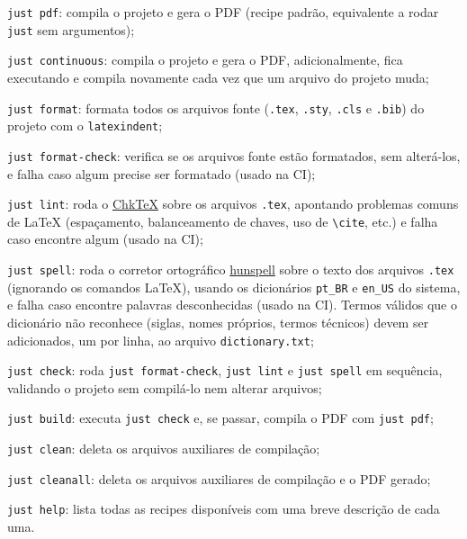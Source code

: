 \begin{alineas}
  \item \texttt{just pdf}: compila o projeto e gera o PDF (recipe padrão, equivalente a rodar \texttt{just} sem argumentos);

  \item \texttt{just continuous}: compila o projeto e gera o PDF, adicionalmente, fica executando e compila novamente cada vez que um arquivo do projeto muda;

  \item \texttt{just format}: formata todos os arquivos fonte (\texttt{.tex}, \texttt{.sty}, \texttt{.cls} e \texttt{.bib}) do projeto com o \texttt{latexindent};

  \item \texttt{just format-check}: verifica se os arquivos fonte estão formatados, sem alterá-los, e falha caso algum precise ser formatado (usado na CI);

  \item \texttt{just lint}: roda o  \href{https://www.nongnu.org/chktex/}{ChkTeX} sobre os arquivos \texttt{.tex}, apontando problemas comuns de \LaTeX{} (espaçamento, balanceamento de chaves, uso de \texttt{\textbackslash{}cite}, etc.) e falha caso encontre algum (usado na CI); %

  \item \texttt{just spell}: roda o corretor ortográfico \href{https://hunspell.github.io/}{hunspell} sobre o texto dos arquivos \texttt{.tex} (ignorando os comandos \LaTeX{}), usando os dicionários \texttt{pt\_BR} e \texttt{en\_US} do sistema, e falha caso encontre palavras desconhecidas (usado na CI). Termos válidos que o dicionário não reconhece (siglas, nomes próprios, termos técnicos) devem ser adicionados, um por linha, ao arquivo \texttt{dictionary.txt};

  \item \texttt{just check}: roda \texttt{just format-check}, \texttt{just lint} e \texttt{just spell} em sequência, validando o projeto sem compilá-lo nem alterar arquivos;

  \item \texttt{just build}: executa \texttt{just check} e, se passar, compila o PDF com \texttt{just pdf};

  \item \texttt{just clean}: deleta os arquivos auxiliares de compilação;

  \item \texttt{just cleanall}: deleta os arquivos auxiliares de compilação e o PDF gerado;

  \item \texttt{just help}: lista todas as recipes disponíveis com uma breve descrição de cada uma.
\end{alineas}


